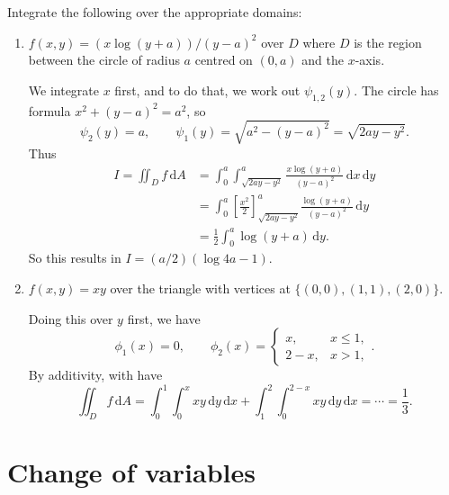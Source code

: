\documentclass[letter-paper]{tufte-book}
\newenvironment{example}[1][Example]{\begin{trivlist}
\item[\hskip \labelsep {\bfseries #1}]}{\end{trivlist}}
\begin{document}
\begin{example}
  Integrate the following over the appropriate domains:  
  
  \begin{enumerate}
    \item $f(x,y) = (x\log(y+a))/(y-a)^2$ over $D$ where $D$ is the region
    between the circle of radius $a$ centred on $(0,a)$ and the $x$-axis.
  
    We integrate $x$ first, and to do that, we work out $\psi_{1,2}(y)$. The
    circle has formula $x^2 + (y-a)^2 = a^2$, so
    \begin{equation*}
      \psi_2(y) = a,\qquad \psi_1(y) = \sqrt{a^2 - (y-a)^2} = \sqrt{2ay-y^2}.
    \end{equation*}
    Thus
    \begin{align*}
      I = \iint_D f\, \mathrm{d}A &= \int_0^a \int_{\sqrt{2ay-y^2}}^a \frac{x\log(y+a)}{(y-a)^2}\, \mathrm{d}x\,\mathrm{d}y \\
        &= \int_0^a \left[\frac{x^2}{2}\right]_{\sqrt{2ay-y^2}}^a \frac{\log(y+a)}{(y-a)^2}\, \mathrm{d}y\\
        &= \frac{1}{2}\int_0^a \log(y+a)\, \mathrm{d}y.
    \end{align*}
    So this results in $I = (a/2)(\log4a -1)$.
    
    \item $f(x,y) = xy$ over the triangle with vertices at $\{(0,0), (1,1),
    (2,0)\}$.
    
    Doing this over $y$ first, we have
    \begin{equation*}
      \phi_1(x) = 0,\qquad \phi_2(x) = \begin{cases}x,& x\leq 1,\\ 2-x,& x>1,
      \end{cases}.
    \end{equation*}
    By additivity, with have
    \begin{equation*}
      \iint_D f\, \mathrm{d}A = \int_0^1 \int_0^x xy\, \mathrm{d}y\, \mathrm{d}x
      + \int_1^2 \int_0^{2-x} xy\, \mathrm{d}y\,\mathrm{d}x
      = \cdots = \frac{1}{3}.
    \end{equation*}
    \end{enumerate}
\end{example}


\section{Change of variables}
\end{document}

